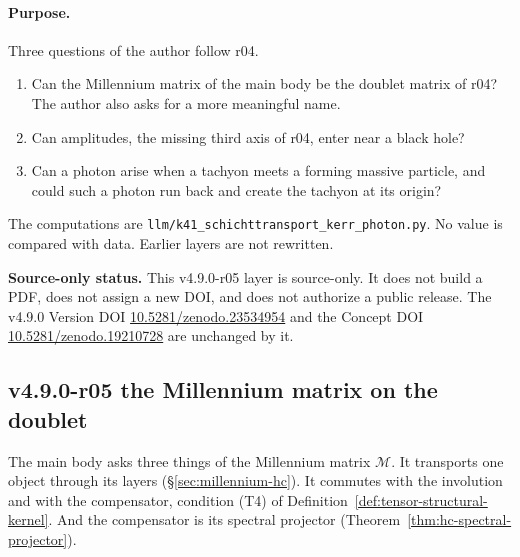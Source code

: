 \paragraph{Purpose.}
Three questions of the author follow r04.
\begin{enumerate}[leftmargin=2em]
\item Can the Millennium matrix of the main body be the doublet matrix of r04?  The author also asks for a more
meaningful name.
\item Can amplitudes, the missing third axis of r04, enter near a black hole?
\item Can a photon arise when a tachyon meets a forming massive particle, and could such a photon run back and create
the tachyon at its origin?
\end{enumerate}
The computations are \texttt{llm/k41\_schichttransport\_kerr\_photon.py}.  No value is compared with data.  Earlier
layers are not rewritten.

\noindent\textbf{Source-only status.}
This v4.9.0-r05 layer is source-only.  It does not build a PDF, does not assign a new DOI,
and does not authorize a public release.  The v4.9.0 Version DOI
\href{https://doi.org/10.5281/zenodo.23534954}{10.5281/zenodo.23534954} and the Concept DOI
\href{https://doi.org/10.5281/zenodo.19210728}{10.5281/zenodo.19210728} are unchanged by it.

\subsection*{v4.9.0-r05 the Millennium matrix on the doublet}
\label{subsec:v490-r05-millennium}

The main body asks three things of the Millennium matrix \(\mathcal M\).  It transports one object through its layers
(\S\ref{sec:millennium-hc}).  It commutes with the involution and with the compensator, condition (T4) of
Definition~\ref{def:tensor-structural-kernel}.  And the compensator is its spectral projector
(Theorem~\ref{thm:hc-spectral-projector}).


